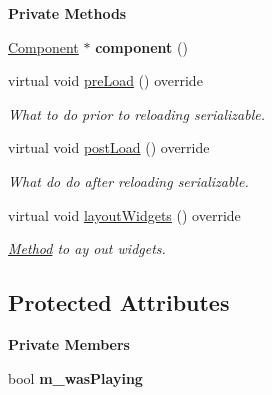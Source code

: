 \begin{Indent}\textbf{ Private Methods}\par
\begin{DoxyCompactItemize}
\item 
\mbox{\label{classrev_1_1_view_1_1_component_json_widget_a83006b433902a0b525d54c772e4c00a6}} 
\mbox{\hyperlink{classrev_1_1_component}{Component}} $\ast$ {\bfseries component} ()
\item 
\mbox{\label{classrev_1_1_view_1_1_component_json_widget_a343dd3baefe77b0d010480188d76e3db}} 
virtual void \mbox{\hyperlink{classrev_1_1_view_1_1_component_json_widget_a343dd3baefe77b0d010480188d76e3db}{pre\+Load}} () override
\begin{DoxyCompactList}\small\item\em What to do prior to reloading serializable. \end{DoxyCompactList}\item 
\mbox{\label{classrev_1_1_view_1_1_component_json_widget_a8bfad75ee6a06f4e91cc7870f519e7dc}} 
virtual void \mbox{\hyperlink{classrev_1_1_view_1_1_component_json_widget_a8bfad75ee6a06f4e91cc7870f519e7dc}{post\+Load}} () override
\begin{DoxyCompactList}\small\item\em What do do after reloading serializable. \end{DoxyCompactList}\item 
\mbox{\label{classrev_1_1_view_1_1_component_json_widget_a99a33affa9e87f04786cfb5571071bcb}} 
virtual void \mbox{\hyperlink{classrev_1_1_view_1_1_component_json_widget_a99a33affa9e87f04786cfb5571071bcb}{layout\+Widgets}} () override
\begin{DoxyCompactList}\small\item\em \mbox{\hyperlink{struct_method}{Method}} to ay out widgets. \end{DoxyCompactList}\end{DoxyCompactItemize}
\end{Indent}
\subsection*{Protected Attributes}
\begin{Indent}\textbf{ Private Members}\par
\begin{DoxyCompactItemize}
\item 
\mbox{\label{classrev_1_1_view_1_1_component_json_widget_ae5b42425b18b3219a598127a890ef538}} 
bool {\bfseries m\+\_\+was\+Playing}
\end{DoxyCompactItemize}
\end{Indent}

